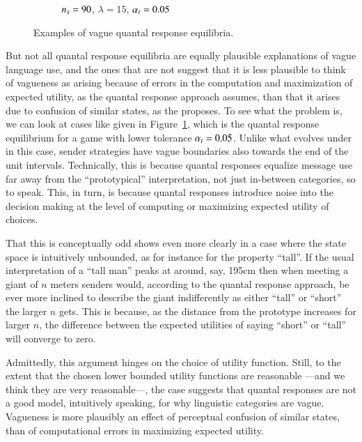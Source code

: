 \begin{figure}
\begin{subfigure}[]{0.45\textwidth}
    \caption{$n_s = 90$, $\lambda = 15$, $\alpha_t = 0.05$}
    \label{fig:exampleQRE_stratsB}
  \end{subfigure}

  \caption{Examples of vague quantal response equilibria.}
  \label{fig:exampleQREs}
\end{figure}


But not all quantal response equilibria are equally plausible
explanations of vague language use, and the ones that are not suggest
that it is less plausible to think of vagueness as arising because of
errors in the computation and maximization of expected utility, as the
quantal response approach assumes, than that it arises due to
confusion of similar states, as the \rdd proposes. To see what the
problem is, we can look at cases like given in
Figure~\ref{fig:exampleQRE_stratsB}, which is the quantal response
equilibrium for a game with lower tolerance $\alpha_t = 0.05$. Unlike
what evolves under \rdd in this case, sender strategies have vague
boundaries also towards the end of the unit intervals. Technically,
this is because quantal responses equalize message use far away from
the ``prototypical'' interpretation, not just in-between categories,
so to speak. This, in turn, is because quantal responses introduce
noise into the decision making at the level of computing or maximizing
expected utility of choices.

That this is conceptually odd shows even more clearly in a case where
the state space is intuitively unbounded, as for instance for the
property ``tall''. If the usual interpretation of a ``tall man'' peaks
at around, say, 195cm then when meeting a giant of $n$ meters senders
would, according to the quantal response approach, be ever more
inclined to describe the giant indifferently as either ``tall'' or
``short'' the larger $n$ gets. This is because, as the distance from
the prototype increases for larger $n$, the difference between the
expected utilities of saying ``short'' or ``tall'' will converge to
zero. 

Admittedly, this argument hinges on the choice of utility
function. Still, to the extent that the chosen lower bounded utility
functions are reasonable ---and we think they are very reasonable---,
the case suggests that quantal responses are not a good model,
intuitively speaking, for why linguistic categories are
vague. Vagueness is more plausibly an effect of perceptual confusion
of similar states, than of computational errors in maximizing expected
utility.




